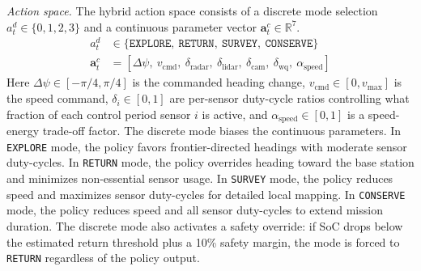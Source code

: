 \documentclass[conference]{IEEEtran}
\begin{document}
\textit{Action space.} The hybrid action space consists of a discrete mode selection $a^d_t \in \{0, 1, 2, 3\}$ and a continuous parameter vector $\boldsymbol{a}^c_t \in \mathbb{R}^7$.
\begin{align}
a^d_t &\in \{\texttt{EXPLORE},\ \texttt{RETURN},\ \texttt{SURVEY},\ \texttt{CONSERVE}\} \\
\boldsymbol{a}^c_t &= [\Delta\psi,\ v_{\text{cmd}},\ \delta_{\text{radar}},\ \delta_{\text{lidar}},\ \delta_{\text{cam}},\ \delta_{\text{wq}},\ \alpha_{\text{speed}}]
\end{align}
Here $\Delta\psi \in [-\pi/4, \pi/4]$ is the commanded heading change, $v_{\text{cmd}} \in [0, v_{\max}]$ is the speed command, $\delta_i \in [0, 1]$ are per-sensor duty-cycle ratios controlling what fraction of each control period sensor $i$ is active, and $\alpha_{\text{speed}} \in [0, 1]$ is a speed-energy trade-off factor. The discrete mode biases the continuous parameters. In \texttt{EXPLORE} mode, the policy favors frontier-directed headings with moderate sensor duty-cycles. In \texttt{RETURN} mode, the policy overrides heading toward the base station and minimizes non-essential sensor usage. In \texttt{SURVEY} mode, the policy reduces speed and maximizes sensor duty-cycles for detailed local mapping. In \texttt{CONSERVE} mode, the policy reduces speed and all sensor duty-cycles to extend mission duration. The discrete mode also activates a safety override: if SoC drops below the estimated return threshold plus a 10\% safety margin, the mode is forced to \texttt{RETURN} regardless of the policy output.
\end{document}
